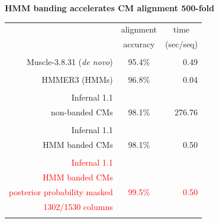 \documentclass[landscape]{slides}
\begin{document}
\begin{slide}
\begin{center}
\textbf{HMM banding accelerates CM alignment 500-fold}
\end{center}
\medskip
\medskip
\begin{center}

\begin{tabular}{rcr} 
& \multicolumn{1}{c}{alignment} & \multicolumn{1}{c}{time} \\
& \multicolumn{1}{c}{accuracy} & \multicolumn{1}{c}{(sec/seq)} \\ \hline
& \multicolumn{1}{c}{} & \multicolumn{1}{c}{} \\
Muscle-3.8.31 (\emph{de novo}) & 95.4\% & 0.49 \\
& \multicolumn{1}{c}{} & \multicolumn{1}{c}{} \\
HMMER3 (HMMs) & 96.8\% & 0.04 \\ 
& \multicolumn{1}{c}{} & \multicolumn{1}{c}{} \\
Infernal 1.1   & & \\
non-banded CMs & 98.1\% & 276.76 \\
& \multicolumn{1}{c}{} & \multicolumn{1}{c}{} \\
Infernal 1.1   & & \\
HMM banded CMs & 98.1\% & 0.50 \\ %
& \multicolumn{1}{c}{} & \multicolumn{1}{c}{} \\
\textcolor{red}{Infernal 1.1} & & \\
\textcolor{red}{HMM banded CMs} & & \\
\textcolor{red}{posterior probability masked} & \textcolor{red}{99.5\%} & \textcolor{red}{0.50} \\ 
\textcolor{red}{1302/1530 columns} & & \\
& \multicolumn{1}{c}{} & \multicolumn{1}{c}{} \\
\end{tabular}
\end{center}


\vfill
\end{slide}
\end{document}
